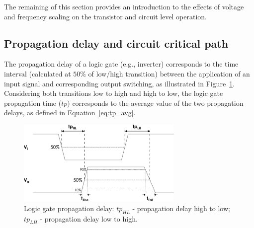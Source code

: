 The remaining of this section provides an introduction to the effects of voltage and frequency scaling on the transistor and circuit level operation.





\subsection{Propagation delay and circuit critical path}

The propagation delay of a logic gate (e.g., inverter) corresponds to the time interval (calculated at $50\%$ of low/high transition) between the application of an input signal and corresponding output switching, as illustrated in Figure~\ref{fig:tp}. Considering both transitions low to high and high to low, the logic gate propagation time ($tp$) corresponds to the average value of the two propagation delays, as defined in Equation~\ref{eq:tp_avg}.

\begin{figure}[htb]
    \centering
    \includegraphics[width=80mm]{Figures/Background/propagation_delay.pdf}
    \caption{Logic gate propagation delay: $tp_{HL}$ - propagation delay high to low; $tp_{LH}$ - propagation delay low to high.}
    \label{fig:tp}
\end{figure}

